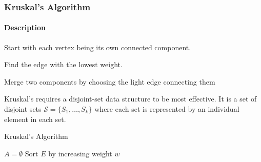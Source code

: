 \documentclass[10pt]{article}
\begin{document}
\subsubsection{Kruskal's Algorithm}
\paragraph{Description}\begin{itemize*}
	\item Start with each vertex being its own connected component.
	\item Find the edge with the lowest weight.
	\item Merge two components by choosing the light edge connecting them
\end{itemize*}
Kruskal's requires a disjoint-set data structure to be most effective.  It is a set of disjoint sets $\mathcal S=\{S_1,\ldots,S_k\}$ where each set is represented by an individual element in each set.
\begin{algorithm}
	\caption{Kruskal's Algorithm}
	$A=\emptyset$\;
	Sort $E$ by increasing weight $w$\;
	\;
\end{algorithm}
\end{document}
